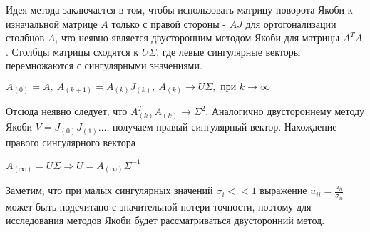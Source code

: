 Идея метода заключается в том, чтобы использовать матрицу поворота Якоби к изначальной матрице $A$ только с правой стороны - $AJ$ для ортогонализации столбцов $A$, что неявно является двусторонним методом Якоби для матрицы $A^TA$.
Столбцы матрицы сходятся к $U\Sigma$, где левые сингулярные векторы перемножаются с сингулярными значениями.
\begin{center}
     $A_{(0)}=A,\ A_{(k+1)} = A_{(k)}J_{(k)},\ A_{(k)} \longrightarrow U\Sigma, \text{ при } k\to\infty$
 \end{center}
 Отсюда неявно следует, что $A^T_{(k)}A_{(k)} \to \Sigma^2$. Аналогично двустороннему методу Якоби $V = J_{(0)}J_{(1)}...$, получаем правый сингулярный вектор. Нахождение правого сингулярного вектора 
 \begin{center}
     $A_{(\infty)} = U\Sigma \Rightarrow U = A_{(\infty)}\Sigma^{-1}$
 \end{center}

 Заметим, что при малых сингулярных значений $\sigma_i<<1$ выражение $u_{ii} = \frac{a_{ii}}{\sigma_{ii}}$ может быть подсчитано с значительной потери точности, поэтому для исследования методов Якоби будет рассматриваться двусторонний метод.

